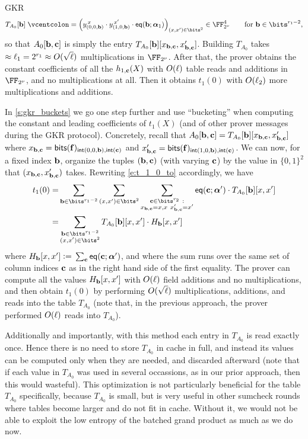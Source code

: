 \begin{lncsmove}{GKR}
\[
T_{A_0}[\bb]\defeq \Big( y_{(0,0,\bb)}^{\,x}\cdot y_{(1,0,\bb)}^{\,x'}\cdot \eq(\bb;\bm{\alpha}_1)\Big)_{(x,x')\in \bits^2} \in \comfield^4 \qquad \text{for } \bb\in \bits^{r_1-2},
\]
so that $A_0[\mathbf{b},\mathbf{c}]$ is simply the entry $T_{A_0}[\mathbf{b}][x_{\mathbf{b},\mathbf{c}},x_{\mathbf{b},\mathbf{c}}']$. Building $T_{A_0}$ takes $\approx \ell_1 = 2^{r_1} \approx O(\sqrt{\ell})$ multiplications in $\comfield$. After that, the prover obtains the constant coefficients of all the $h_{1,\mathbf{c}}(X)$ with $O(\ell)$ table reads and  additions in $\comfield$, and no multiplications at all. Then it obtains $t_1(0)$ with $O(\ell_2)$  more multiplications and additions. 

In \cref{s:gkr_buckets} we go one step further and use ``bucketing'' when computing the constant and leading coefficients of $t_1(X)$ (and of other prover messages during the GKR protocol). Concretely, recall that $A_0[\mathbf{b},\mathbf{c}]= T_{A_0}[\mathbf{b}][x_{\mathbf{b},\mathbf{c}},x_{\mathbf{b},\mathbf{c}}']$ where  $x_{\mathbf{b},\mathbf{c}}=\mathsf{bits}(\mathbf{f})_{\mathsf{int}(0,0,\mathbf{b}),\mathsf{int}(\mathbf{c})}$ and $x_{\mathbf{b},\mathbf{c}}'=\mathsf{bits}(\mathbf{f})_{\mathsf{int}(1,0,\mathbf{b}),\mathsf{int}(\mathbf{c})}$. We can now, for a fixed index $\mathbf{b}$, organize the tuples $(\mathbf{b},\mathbf{c})$ (with varying $\mathbf{c}$) by the value in $\{0,1\}^2$ that $(x_{\mathbf{b},\mathbf{c}},x_{\mathbf{b},\mathbf{c}}')$ takes. Rewriting \eqref{e:t_1_0_to} accordingly, we have 
%
\begin{align*}
t_1(0)=& \sum_{\bb\in \bits^{r_1-2}} \sum_{(x,x')\in \bits^2} \sum_{\substack{
    \cc\in \bits^{r_2}\ :\\ 
    x_{\bb,\cc} = x,x\ 
    x_{\bb,\cc}'=x'
    }
    } \eq(\cc;\bm{\alpha}') \cdot  T_{A_0}[\bb][x,x']\\ =& \sum_{\substack{\bb\in \bits^{r_1-2}\\(x,x')\in \bits^2}}  T_{A_0}[\bb][x,x']  \cdot H_\bb[x,x']
\end{align*}
where $H_{\mathbf{b}}[x,x']{\;\vcentcolon=\;} \sum_{\mathbf{c}} \mathsf{eq}(\mathbf{c};\bm{\alpha}')$, and where the sum runs over the same set of column indices $\mathbf{c}$ as in the right hand side of the first equality. The prover can compute all the values $H_{\mathbf{b}}[x,x']$ with $O(\ell)$ field additions and no multiplications, and then obtain $t_1(0)$ by performing $O(\sqrt{\ell})$ multiplications, additions, and reads into the table $T_{A_0}$ (note that, in the previous approach, the prover performed $O(\ell)$ reads into $T_{A_0}$). 

Additionally and importantly, with this method each entry in $T_{A_0}$ is read exactly once. Hence there is no need to store $T_{A_0}$ in cache in full, and instead its values can be computed only when they are needed, and discarded afterward (note that if each value in $T_{A_0}$ was used in several occassions, as in our prior approach, then this would wasteful). This optimization  is not particularly beneficial for the table $T_{A_0}$ specifically, because $T_{A_0}$ is small, but is very useful in other sumcheck rounds where tables become larger and do not fit in cache. Without it, we would not be able to exploit the low entropy of the batched grand product as much as we do now.



\end{lncsmove}
